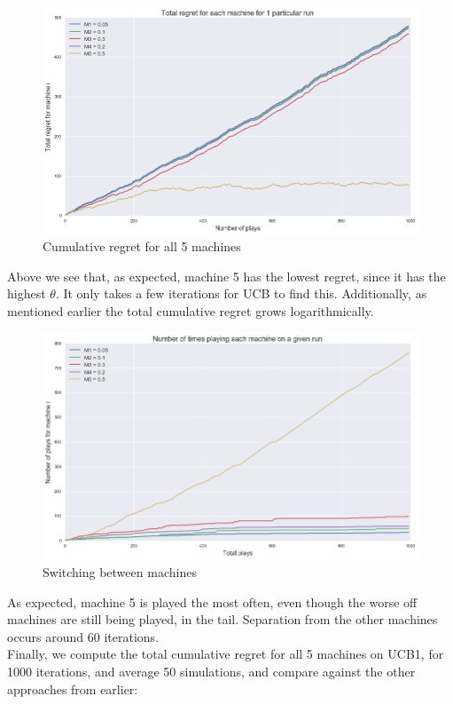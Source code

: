 \documentclass{article}
\begin{document}
\begin{figure}[H]
\centering
\includegraphics[scale=0.4]{UCB_regret.png}
\caption{Cumulative regret for all 5 machines}
\end{figure}

Above we see that, as expected, machine 5 has the lowest regret, since it has the highest $\theta$. It only takes a few iterations for UCB to find this. Additionally, as mentioned earlier the total cumulative regret grows logarithmically. 

\begin{figure}[H]
\centering
\includegraphics[scale=0.4]{UCB_num_plays.png}
\caption{Switching between machines}
\end{figure}

As expected, machine 5 is played the most often, even though the worse off machines are still being played, in the tail. Separation from the other machines occurs around 60 iterations.\\

Finally, we compute the total cumulative regret for all 5 machines on UCB1, for 1000 iterations, and average 50 simulations, and compare against the other approaches from earlier:
\end{document}
